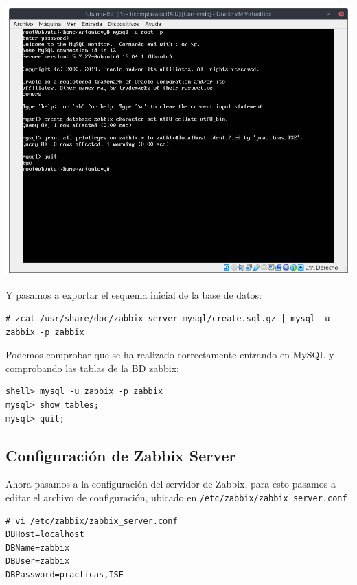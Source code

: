 \documentclass[12pt, spanish]{article}
\begin{document}
\begin{center}
\includegraphics[scale=0.45]{creacion_BD.png}
\end{center}

Y pasamos a exportar el esquema inicial de la base de datos:

\begin{verbatim}
# zcat /usr/share/doc/zabbix-server-mysql/create.sql.gz | mysql -u zabbix -p zabbix
\end{verbatim}

Podemos comprobar que se ha realizado correctamente entrando en MySQL y comprobando las tablas de la BD zabbix:

\begin{verbatim}
shell> mysql -u zabbix -p zabbix
mysql> show tables;
mysql> quit;
\end{verbatim}

\newpage

\subsection{Configuración de Zabbix Server}

Ahora pasamos a la configuración del servidor de Zabbix, para esto pasamos a editar el archivo de configuración, ubicado en \texttt{/etc/zabbix/zabbix\_server.conf}

\begin{verbatim}
# vi /etc/zabbix/zabbix_server.conf
DBHost=localhost
DBName=zabbix
DBUser=zabbix
DBPassword=practicas,ISE 
\end{verbatim}
\end{document}
